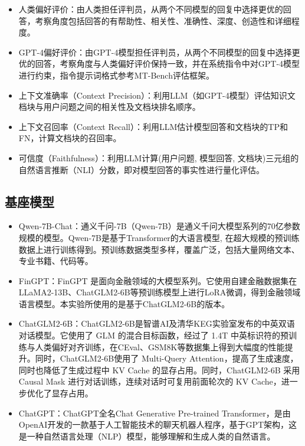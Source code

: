\begin{itemize}[topsep = 0 pt, itemsep= 0 pt, parsep=0pt, partopsep=0pt, leftmargin=36pt, itemindent=0pt, labelsep=6pt, listparindent=24pt]
	\item 人类偏好评价：由人类担任评判员，从两个不同模型的回复中选择更优的回答，考察角度包括回答的有帮助性、相关性、准确性、深度、创造性和详细程度。
	\item GPT-4偏好评价：由GPT-4\cite{DBLP:journals/corr/abs-2303-08774}模型担任评判员，从两个不同模型的回复中选择更优的回答，考察角度与人类偏好评价保持一致，并在系统指令中对GPT-4模型进行约束，指令提示词格式参考MT-Bench\cite{zheng2023judging}评估框架。
	\item 上下文准确率（Context Precision）：利用LLM（如GPT-4模型）评估知识文档块与用户问题之间的相关性及文档块排名顺序。
	\item 上下文召回率（Context Recall）：利用LLM估计模型回答和文档块的TP和FN，计算文档块的召回率。
	\item 可信度（Faithfulness）：利用LLM计算(用户问题, 模型回答, 文档块)三元组的自然语言推断（NLI）分数，即对模型回答的事实性进行量化评估。
\end{itemize}

\subsection{基座模型}

\begin{itemize}[topsep = 0 pt, itemsep= 0 pt, parsep=0pt, partopsep=0pt, leftmargin=36pt, itemindent=0pt, labelsep=6pt, listparindent=24pt]
	\item Qwen-7B-Chat\cite{DBLP:journals/corr/abs-2309-16609}：通义千问-7B（Qwen-7B）是通义千问大模型系列的70亿参数规模的模型。Qwen-7B是基于Transformer的大语言模型, 在超大规模的预训练数据上进行训练得到。预训练数据类型多样，覆盖广泛，包括大量网络文本、专业书籍、代码等。
	\item FinGPT\cite{yang2023fingpt}：FinGPT 是面向金融领域的大模型系列。它使用自建金融数据集在LLaMA2-13B\cite{DBLP:journals/corr/abs-2307-09288}、ChatGLM2-6B等预训练模型上进行LoRA微调，得到金融领域语言模型。本实验所使用的是基于ChatGLM2-6B的版本。
	\item ChatGLM2-6B\cite{DBLP:conf/iclr/ZengLDWL0YXZXTM23}：ChatGLM2-6B是智谱AI及清华KEG实验室发布的中英双语对话模型。它使用了 GLM 的混合目标函数，经过了 1.4T 中英标识符的预训练与人类偏好对齐训练，在CEval、GSM8K等数据集上得到大幅度的性能提升。同时，ChatGLM2-6B使用了 Multi-Query Attention，提高了生成速度，同时也降低了生成过程中 KV Cache 的显存占用。同时，ChatGLM2-6B 采用 Causal Mask 进行对话训练，连续对话时可复用前面轮次的 KV Cache，进一步优化了显存占用。
	\item ChatGPT\cite{DBLP:conf/nips/Ouyang0JAWMZASR22}：ChatGPT全名Chat Generative Pre-trained Transformer，是由OpenAI开发的一款基于人工智能技术的聊天机器人程序，基于GPT\cite{radford2018improving}架构，这是一种自然语言处理（NLP）模型，能够理解和生成人类的自然语言。
\end{itemize}

